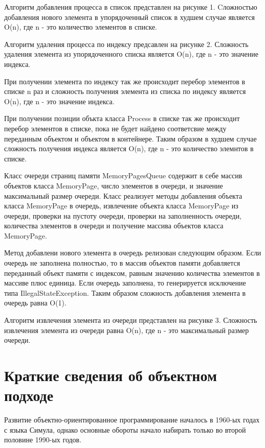 \documentclass[russian,utf8,simple,hpadding=10mm,vpadding=20mm]{eskdtext}
\begin{document}

Алгоритм  добавления процесса в список представлен на  рисунке 1.  Cложностью добавления нового элемента в упорядоченный список в худшем случае является O(n), где n - это количество элементов в списке.


Алгоритм удаления процесса по индексу предсавлен на рисунке 2. Сложность удаления элемента из упорядоченного списка является O(n), где n - это значение индекса.


При получении элемента по индексу так же происходит перебор элементов в списке n раз и сложность получения элемента из списка по индексу является O(n), где n - это значение индекса.

При получении позиции объкта класса Process в списке  так же происходит перебор элементов в списке, пока не будет найдено соответсвие между переданным объектом и объектом в контейнере. Таким образом в худшем случае сложность получения индекса является O(n), где n - это количество элемнтов в списке.

Класс очереди страниц памяти MemoryPagesQueue содержит в себе массив объектов класса MemoryPage, число элементов в очереди, и значение максимальный размер очереди. Класс реализует методы добавления объекта класса MemoryPage в очередь, извлечение объекта класса MemoryPage из очереди, проверки на пустоту очереди, проверки на заполненность очереди, количества элементов в очереди и получение массива объектов класса MemoryPage.


Метод добавлени нового элемента в очередь релизован следующим образом. Если очередь не заполнена полностью, то в массив объектов памяти добавляется переданный объект памяти с индексом, равным значению количества элементов в массиве плюс единица. Если очередь заполнена, то генерируется исключение типа IllegalStateException. Таким образом сложность добавления элемента в очередь равна O(1).

Алгоритм извлечения  элемента из очереди представлен на рисунке 3. Сложность извлечения элемента из очереди равна O(n), где n - это максимальный размер очереди.

\newpage
\parindent=15mm
\doublespacing
\section{Краткие сведения об объектном подходе}
Развитие объектно-ориентированное программирование началось в 1960-ых годах с языка Симула, однако основные обороты начало набирать только во второй половине 1990-ых годов. 
\end{document}
